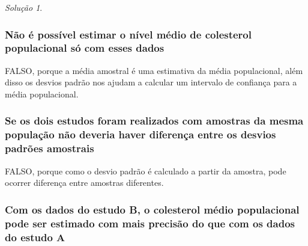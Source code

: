 \documentclass[
]{latex/krantz}
\theoremstyle{definition}
\theoremstyle{definition}
\theoremstyle{definition}
\theoremstyle{definition}
\theoremstyle{remark}
\newtheorem*{solution}{Solução}
\begin{document}
\begin{solution}
\leavevmode

\hypertarget{nuxe3o-uxe9-possuxedvel-estimar-o-nuxedvel-muxe9dio-de-colesterol-populacional-suxf3-com-esses-dados}{%
\subsubsection*{Não é possível estimar o nível médio de colesterol populacional só com esses dados}\label{nuxe3o-uxe9-possuxedvel-estimar-o-nuxedvel-muxe9dio-de-colesterol-populacional-suxf3-com-esses-dados}}

FALSO, porque a média amostral é uma estimativa da média populacional, além disso os desvios padrão nos ajudam a calcular um intervalo de confiança para a média populacional.

\hypertarget{se-os-dois-estudos-foram-realizados-com-amostras-da-mesma-populauxe7uxe3o-nuxe3o-deveria-haver-diferenuxe7a-entre-os-desvios-padruxf5es-amostrais}{%
\subsubsection*{Se os dois estudos foram realizados com amostras da mesma população não deveria haver diferença entre os desvios padrões amostrais}\label{se-os-dois-estudos-foram-realizados-com-amostras-da-mesma-populauxe7uxe3o-nuxe3o-deveria-haver-diferenuxe7a-entre-os-desvios-padruxf5es-amostrais}}

FALSO, porque como o desvio padrão é calculado a partir da amostra, pode ocorrer diferença entre amostras diferentes.

\hypertarget{com-os-dados-do-estudo-b-o-colesterol-muxe9dio-populacional-pode-ser-estimado-com-mais-precisuxe3o-do-que-com-os-dados-do-estudo-a}{%
\subsubsection*{Com os dados do estudo B, o colesterol médio populacional pode ser estimado com mais precisão do que com os dados do estudo A}\label{com-os-dados-do-estudo-b-o-colesterol-muxe9dio-populacional-pode-ser-estimado-com-mais-precisuxe3o-do-que-com-os-dados-do-estudo-a}}


\end{solution}
\end{document}
